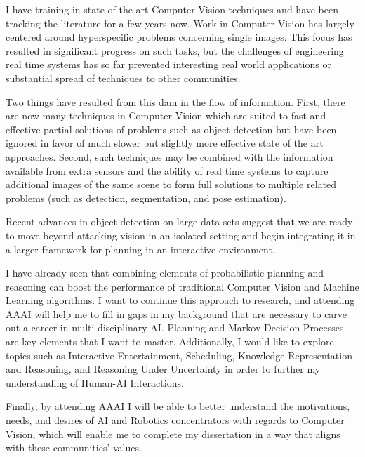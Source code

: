 \documentclass[12pt]{article}
\numberwithin{equation}{section}
\numberwithin{table}{section}
\numberwithin{figure}{section}
\begin{document}
  I have training in state of the art Computer Vision techniques and have been tracking the literature for a few
years now. Work in Computer Vision has largely centered around hyperspecific problems concerning
single images. This focus has resulted in significant progress on such tasks, but the challenges of 
engineering real time systems has so far prevented interesting real world applications
or substantial spread of techniques to other communities. 

Two things have resulted from this dam in the flow of information. 
First, there are now many techniques in Computer Vision which are suited
to fast and effective partial solutions of problems such as object detection
but have been ignored in favor of much slower but slightly more effective state of the art
approaches.  Second, such techniques may be combined with the information available from
extra sensors and the ability of real time systems to capture additional images of the same scene
to form full solutions to multiple related problems (such as detection, segmentation, and pose estimation). 

Recent advances in object detection on large data sets suggest that we are ready
to move beyond attacking vision in an isolated setting and begin integrating it in a
larger framework for planning in an interactive environment. 
 
I have already seen that combining elements of probabilistic planning and reasoning can boost
the performance of traditional Computer Vision and Machine Learning algorithms.  I want to
continue this approach to research, and attending AAAI will help me to fill in gaps in my
background that are necessary to carve out a career in multi-disciplinary AI.  
Planning and Markov Decision Processes are key elements that I want to master. Additionally,
I would like to explore topics such as Interactive Entertainment, Scheduling, Knowledge
Representation and Reasoning, and Reasoning Under Uncertainty in order to further my
understanding of Human-AI Interactions.

Finally, by attending AAAI I will be able to better understand the motivations, needs, and desires 
of AI and Robotics concentrators with regards to Computer Vision, which will enable me 
to complete my dissertation in a way that aligns with these communities' values.

\newpage
\end{document}

